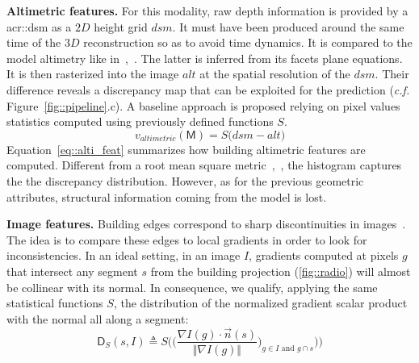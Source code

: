 \documentclass[runningheads]{llncs}
\begin{document}
\noindent
\textbf{Altimetric features.}
For this modality, raw depth information is provided by a \acrlong{acr::dsm} as a $2D$ height grid $dsm$. It must have been produced around the same time of the $3D$ reconstruction so as to avoid time dynamics. It is compared to the model altimetry like in~\cite{Bredif2007},~\cite{zebedin2008fusion}. The latter is inferred from its facets plane equations. It is then rasterized into the image $alt$ at the spatial resolution of the $dsm$. Their difference reveals a discrepancy map that can be exploited for the prediction (\textit{c.f.} Figure~\ref{fig::pipeline}.c). A baseline approach is proposed relying on pixel values statistics computed using previously defined functions $S$.
\begin{equation}
	\label{eq::alti_feat}
    v_{altimetric}(\mathsf{M}) = S\big( dsm - alt \big)
\end{equation}
Equation~\ref{eq::alti_feat} summarizes how building altimetric features are computed. Different from a root mean square metric~\cite{lafarge2012creating},~\cite{Poullis2013}, the histogram captures the the discrepancy distribution. However, as for the previous geometric attributes, structural information coming from the model is lost.

\noindent
\textbf{Image features.}
Building edges correspond to sharp discontinuities in images~\cite{canny1986computational}. The idea is to compare these edges to local gradients in order to look for inconsistencies. In an ideal setting, in an image $I$, gradients computed at pixels $g$ that intersect any segment $s$ from the building projection (\ref{fig::radio}) will almost be collinear with its normal. In consequence, we qualify, applying the same statistical functions $S$, the distribution of the normalized gradient scalar product with the normal all along a segment:
\begin{equation}
	\label{eq::corr_seg}
    \mathsf{D}_S(s, I) \triangleq S \bigg( \Big(\frac{\nabla I(g) \cdot \vec{n}(s)}{\Vert \nabla I(g)\Vert})_{g \in I \textrm{ and } g \cap s} \Big)\bigg)
\end{equation}
\end{document}
